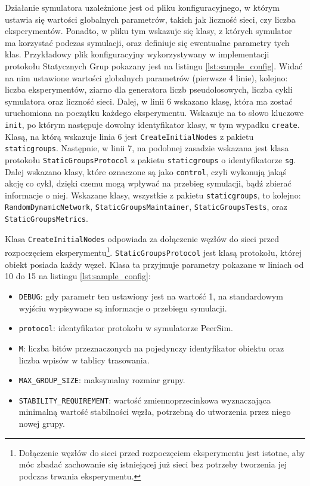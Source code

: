 \documentclass[12pt, twoside, openany]{report}
\begin{document}


Działanie symulatora uzależnione jest od pliku konfiguracyjnego, w którym ustawia się wartości globalnych parametrów, takich jak liczność sieci, czy liczba eksperymentów. Ponadto, w pliku tym wskazuje się klasy, z których symulator ma korzystać podczas symulacji, oraz definiuje się ewentualne parametry tych klas. Przykładowy plik konfiguracyjny wykorzystywany w implementacji protokołu Statycznych Grup pokazany jest na listingu \ref{lst:sample_config}. Widać na nim ustawione wartości globalnych parametrów (pierwsze 4 linie), kolejno: liczba eksperymentów, ziarno dla generatora liczb pseudolosowych, liczba cykli symulatora oraz liczność sieci. Dalej, w linii 6 wskazano klasę, która ma zostać uruchomiona na początku każdego eksperymentu. Wskazuje na to słowo kluczowe \texttt{init}, po którym następuje dowolny identyfikator klasy, w tym wypadku \texttt{create}. Klasą, na którą wskazuje linia 6 jest \texttt{CreateInitialNodes} z pakietu \texttt{staticgroups}. Następnie, w linii 7, na podobnej zasadzie wskazana jest klasa protokołu \texttt{StaticGroupsProtocol} z pakietu \texttt{staticgroups} o identyfikatorze \texttt{sg}. Dalej wskazano klasy, które oznaczone są jako \texttt{control}, czyli wykonują jakąś akcję co cykl, dzięki czemu mogą wpływać na przebieg symulacji, bądź zbierać informacje o niej. Wskazane klasy, wszystkie z pakietu \texttt{staticgroups}, to kolejno: \texttt{RandomDynamicNetwork}, \texttt{StaticGroupsMaintainer}, \texttt{StaticGroupsTests}, oraz \texttt{StaticGroupsMetrics}. 

Klasa \texttt{CreateInitialNodes} odpowiada za dołączenie węzłów do sieci przed rozpoczęciem eksperymentu\footnote{Dołączenie węzłów do sieci przed rozpoczęciem eksperymentu jest istotne, aby móc zbadać zachowanie się istniejącej już sieci bez potrzeby tworzenia jej podczas trwania eksperymentu.}. \texttt{StaticGroupsProtocol} jest klasą protokołu, której obiekt posiada każdy węzeł. Klasa ta przyjmuje parametry pokazane w liniach od 10 do 15 na listingu \ref{lst:sample_config}:
\begin{itemize}
\item \texttt{DEBUG}: gdy parametr ten ustawiony jest na wartość 1, na standardowym wyjściu wypisywane są informacje o przebiegu symulacji.
\item \texttt{protocol}: identyfikator protokołu w symulatorze PeerSim.
\item \texttt{M}: liczba bitów przeznaczonych na pojedynczy identyfikator obiektu oraz liczba wpisów w tablicy trasowania.
\item \texttt{MAX\_GROUP\_SIZE}: maksymalny rozmiar grupy.
\item \texttt{STABILITY\_REQUIREMENT}: wartość zmiennoprzecinkowa wyznaczająca minimalną wartość stabilności węzła, potrzebną do utworzenia przez niego nowej grupy.
\end{itemize}
\end{document}
